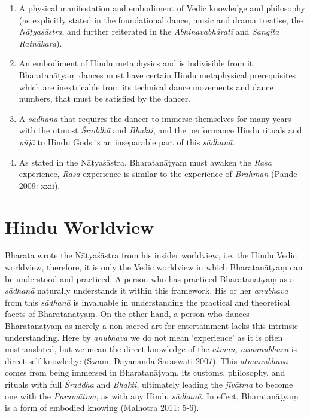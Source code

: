 \begin{enumerate}[{\rm 1)}]
\itemsep=0pt
\item A physical manifestation and embodiment of Vedic knowledge and philosophy (as explicitly stated in the foundational dance, music and drama treatise, the \textit{Nāṭyaśāstra}, and further reiterated in the \textit{Abhinavabhāratī} and \textit{Sangīta Ratnākara}).

 \item An embodiment of Hindu metaphysics and is indivisible from it. Bharatanāṭyaṃ dances must have certain Hindu metaphysical prerequisites which are inextricable from its technical dance movements and dance numbers, that must be satisfied by the dancer.

 \item A \textit{sādhanā} that requires the dancer to immerse themselves for many years with the utmost \textit{Śraddhā} and \textit{Bhakti}, and the performance Hindu rituals and \textit{pūjā} to Hindu Gods is an inseparable part of this \textit{sādhanā}.

 \item As stated in the Nāṭyaśāstra, Bharatanāṭyaṃ must awaken the \textit{Rasa} experience, \textit{Rasa} experience is similar to the experience of \textit{Brahman} (Pande 2009: xxii).

\end{enumerate}


\section*{Hindu Worldview}

Bharata wrote the Nāṭyaśāstra from his insider worldview, i.e. the Hindu Vedic worldview, therefore, it is only the Vedic worldview in which Bharatanāṭyaṃ can be understood and practiced. A person who has practiced Bharatanāṭyaṃ as a \textit{sādhanā }naturally understands it within this framework. His or her \textit{anubhava }from this\textit{ sādhanā }is invaluable in understanding the practical and theoretical facets of Bharatanāṭyaṃ. On the other hand, a person who dances Bharatanāṭyaṃ as merely a non-sacred art for entertainment lacks this intrinsic understanding. Here by \textit{anubhava} we do not mean ‘experience’ as it is often mistranslated, but we mean the direct knowledge of the \textit{ātmān, ātmānubhava }is direct self-knowledge (Swami Dayananda Saraswati 2007). This \textit{ātmānubhava} comes from being immersed in Bharatanāṭyaṃ, its customs, philosophy, and rituals with full \textit{Śraddha} and \textit{Bhakti}, ultimately leading the \textit{jīvātma} to become one with the \textit{Paramātma}, as with any Hindu \textit{sādhanā}. In effect, Bharatanāṭyaṃ is a form of embodied knowing (Malhotra 2011: 5-6).

